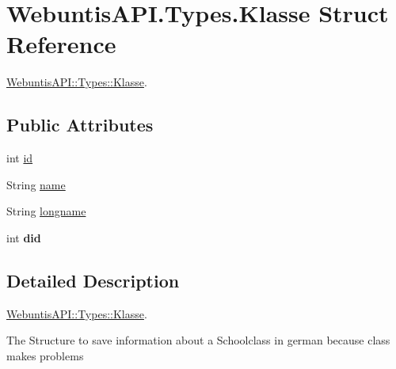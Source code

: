 \hypertarget{struct_webuntis_a_p_i_1_1_types_1_1_klasse}{\section{Webuntis\-A\-P\-I.\-Types.\-Klasse Struct Reference}
\label{struct_webuntis_a_p_i_1_1_types_1_1_klasse}
}


\hyperlink{struct_webuntis_a_p_i_1_1_types_1_1_klasse}{Webuntis\-A\-P\-I\-::\-Types\-::\-Klasse}.  


\subsection*{Public Attributes}
\begin{DoxyCompactItemize}
\item 
int \hyperlink{struct_webuntis_a_p_i_1_1_types_1_1_klasse_a0c8d6c1ce71142b67d20df2c818bbc75}{id}
\item 
String \hyperlink{struct_webuntis_a_p_i_1_1_types_1_1_klasse_a034b759d9d7262da6eaa0613d5f6a0e7}{name}
\item 
String \hyperlink{struct_webuntis_a_p_i_1_1_types_1_1_klasse_a0ec00ea38031e97b255fa139387142e7}{longname}
\item 
\hypertarget{struct_webuntis_a_p_i_1_1_types_1_1_klasse_a0441c438c8e4098068dadb84615d847e}{int {\bfseries did}}\label{struct_webuntis_a_p_i_1_1_types_1_1_klasse_a0441c438c8e4098068dadb84615d847e}

\end{DoxyCompactItemize}


\subsection{Detailed Description}
\hyperlink{struct_webuntis_a_p_i_1_1_types_1_1_klasse}{Webuntis\-A\-P\-I\-::\-Types\-::\-Klasse}. 

The Structure to save information about a Schoolclass in german because class makes problems 

